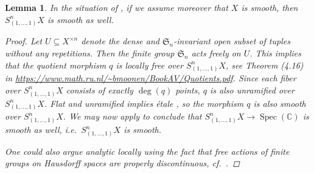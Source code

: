 \documentclass[12pt,a4paper]{amsart}
\theoremstyle{plain}
\newtheorem{lm}[thm]{Lemma}
\theoremstyle{definition}
\theoremstyle{remark}
\begin{document}
\begin{lm}\label{lm:smoothstratum}
  In the situation of , if we assume moreover that $X$ is smooth, then $S^{n}_{(1, \ldots, 1)}X$ is smooth as well.
  
  \begin{proof}
    Let $U \subseteq X^{\times n}$ denote the dense and $\mathfrak{S}_{n}$-invariant open subset of tuples without any repetitions.
    Then the finite group $\mathfrak{S}_{n}$ acts freely on $U$.
    This implies that the quotient morphism $q$ is locally free over $S^{n}_{(1,\ldots,1)}X$, see Theorem (4.16) in \url{https://www.math.ru.nl/~bmoonen/BookAV/Quotients.pdf}.
    Since each fiber over $S^{n}_{(1, \ldots, 1)}X$ consists of exactly $\deg(q)$ points, $q$ is also unramified over $S^{n}_{(1, \ldots, 1)}X$.
    Flat and unramified implies étale \cite[Exercise III.10.3]{har77}, so the morphism $q$ is also smooth over $S^{n}_{(1, \ldots, 1)}X$.
    We may now apply \cite[\href{https://stacks.math.columbia.edu/tag/02K5}{Tag 02K5}]{stacks-project} to conclude that $S^{n}_{(1, \ldots, 1)}X \to \operatorname{Spec}(\mathbb{C})$ is smooth as well, i.e.~$S^{n}_{(1, \ldots, 1)}X$ is smooth.

    One could also argue analytic locally using the fact that free actions of finite groups on Hausdorff spaces are properly discontinuous, cf.~\cite[Exercise III.7.1]{bre97}.
  \end{proof}
\end{lm}
\end{document}
